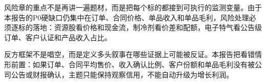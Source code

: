         \begin{exhibitbox}[主题证伪路径]
        \scriptsize
{}
\end{exhibitbox}

风险章的重点不是再讲一遍题材，而是把每个标的都接到可执行的监测变量。由于本报告的P0硬缺口仍集中在订单、合同价格、单品收入和单品毛利，风险处理必须逐标的落地：资源股看价格和现金流，制冷剂看价差和配额，电子特气看公告级订单、客户认证和产品收入占比。

反方框架不是唱空，而是定义多头叙事在哪些证据上可能被反证。本报告把看错情形前置：如果订单、合同平均售价、收入确认比例、客户份额和单品毛利没有被公司公告或财报确认，主题只能保持观察信用，不能自动升级为增长利润。


